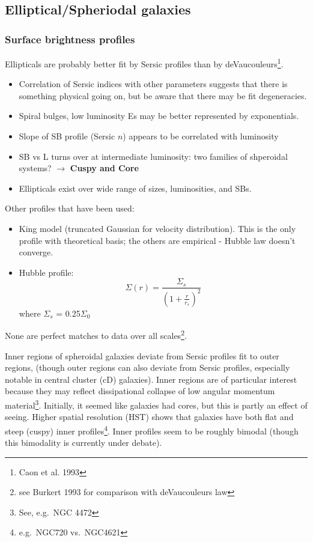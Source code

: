 \documentclass{article}
\newcommand{\mynotes}[1]{\textcolor{cadmiumgreen}{#1}}
\begin{document}
\subsection{Elliptical/Spheriodal galaxies}
\subsubsection{Surface brightness profiles}
Ellipticals are probably better fit by Sersic profiles than by
deVaucouleurs\footnote{Caon et al. 1993}.
\begin{itemize}
    \item Correlation of Sersic indices with other parameters
        suggests that there is something physical going on, but be aware that
        there may be fit degeneracies.
    \item Spiral bulges, low luminosity Es may be better
        represented by exponentials.
    \item Slope of SB profile (Sersic $n$) appears to be correlated with
        luminosity
    \item SB vs L turns over at intermediate luminosity:
        two families of shperoidal systems? \mynotes{
            $\rightarrow$ \textbf{Cuspy and Core}}
    \item Ellipticals exist over wide range of sizes, luminosities, and SBs.
\end{itemize}
Other profiles that have been used:
\begin{itemize}
    \item King model (truncated Gaussian for velocity distribution). This
        is the only profile with theoretical basis; the others are
        empirical - Hubble law doesn't converge.
    \item Hubble profile:
        \[
            \Sigma(r) = \frac{ \Sigma_{s} }
            {\left( 1 + \frac{r}{r_{s}} \right)^{2}}
            \]
        where $\Sigma_{s}$ = 0.25$\Sigma_{0}$
\end{itemize}
None are perfect matches to data over all scales\footnote{see Burkert 1993 for
comparison with deVaucouleurs law}.

Inner regions of spheroidal galaxies deviate from Sersic profiles fit to
outer regions, (though outer regions can also deviate from Sersic profiles,
especially notable in central cluster (cD) galaxies). Inner regions are of
particular interest because they may reflect dissipational collapse of low
angular momentum material\footnote{See, e.g.\ NGC 4472}. Initially, it
seemed like galaxies had cores, but this is partly an effect of seeing.
Higher spatial resolution (HST) shows that galaxies have both flat and
steep (cuspy) inner profiles\footnote{e.g.\ NGC720 vs.\ NGC4621}. Inner
profiles seem to be roughly bimodal (though this bimodality is currently
under debate).
\end{document}
